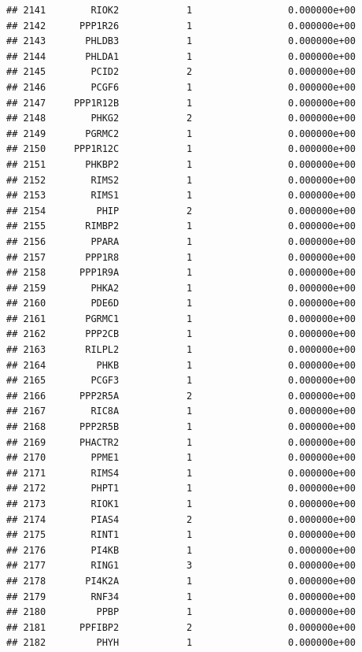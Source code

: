 \documentclass[
]{article}
\begin{document}
\begin{verbatim}
## 2141        RIOK2            1                 0.000000e+00
## 2142      PPP1R26            1                 0.000000e+00
## 2143       PHLDB3            1                 0.000000e+00
## 2144       PHLDA1            1                 0.000000e+00
## 2145        PCID2            2                 0.000000e+00
## 2146        PCGF6            1                 0.000000e+00
## 2147     PPP1R12B            1                 0.000000e+00
## 2148        PHKG2            2                 0.000000e+00
## 2149       PGRMC2            1                 0.000000e+00
## 2150     PPP1R12C            1                 0.000000e+00
## 2151       PHKBP2            1                 0.000000e+00
## 2152        RIMS2            1                 0.000000e+00
## 2153        RIMS1            1                 0.000000e+00
## 2154         PHIP            2                 0.000000e+00
## 2155       RIMBP2            1                 0.000000e+00
## 2156        PPARA            1                 0.000000e+00
## 2157       PPP1R8            1                 0.000000e+00
## 2158      PPP1R9A            1                 0.000000e+00
## 2159        PHKA2            1                 0.000000e+00
## 2160        PDE6D            1                 0.000000e+00
## 2161       PGRMC1            1                 0.000000e+00
## 2162       PPP2CB            1                 0.000000e+00
## 2163       RILPL2            1                 0.000000e+00
## 2164         PHKB            1                 0.000000e+00
## 2165        PCGF3            1                 0.000000e+00
## 2166      PPP2R5A            2                 0.000000e+00
## 2167        RIC8A            1                 0.000000e+00
## 2168      PPP2R5B            1                 0.000000e+00
## 2169      PHACTR2            1                 0.000000e+00
## 2170        PPME1            1                 0.000000e+00
## 2171        RIMS4            1                 0.000000e+00
## 2172        PHPT1            1                 0.000000e+00
## 2173        RIOK1            1                 0.000000e+00
## 2174        PIAS4            2                 0.000000e+00
## 2175        RINT1            1                 0.000000e+00
## 2176        PI4KB            1                 0.000000e+00
## 2177        RING1            3                 0.000000e+00
## 2178       PI4K2A            1                 0.000000e+00
## 2179        RNF34            1                 0.000000e+00
## 2180         PPBP            1                 0.000000e+00
## 2181      PPFIBP2            2                 0.000000e+00
## 2182         PHYH            1                 0.000000e+00

\end{verbatim}
\end{document}
